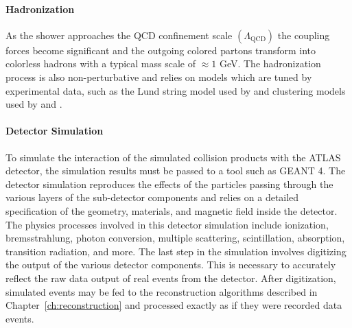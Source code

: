 \paragraph{\textbf{Hadronization}}
As the shower approaches the QCD confinement scale $(\Lambda_{\mathrm{QCD}})$ the coupling forces become significant and the outgoing colored partons transform into colorless hadrons with a typical mass scale of $\approx 1$ GeV.
The hadronization process is also non-perturbative and relies on models which are tuned by experimental data, such as the Lund string model used by \Pythia and clustering models used by \Herwig and \Sherpa.

\paragraph{\textbf{Detector Simulation}}
To simulate the interaction of the simulated collision products with the ATLAS detector, the simulation results must be passed to a tool such as GEANT 4.
The detector simulation reproduces the effects of the particles passing through the various layers of the sub-detector components and relies on a detailed specification of the geometry, materials, and magnetic field inside the detector.
The physics processes involved in this detector simulation include ionization, bremsstrahlung, photon conversion, multiple scattering, scintillation, absorption, transition radiation, and more.
The last step in the simulation involves digitizing the output of the various detector components.
This is necessary to accurately reflect the raw data output of real events from the detector.
After digitization, simulated events may be fed to the reconstruction algorithms described in Chapter~\ref{ch:reconstruction} and processed exactly as if they were recorded data events.

